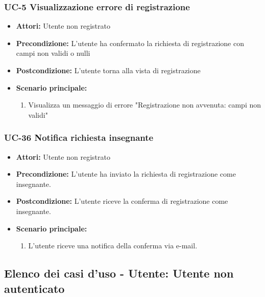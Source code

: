 \subsubsection{UC-5 Visualizzazione errore di registrazione}
\begin{itemize}
	\item \textbf{Attori:} Utente non registrato
	\item \textbf{Precondizione:} L'utente ha confermato la richiesta di registrazione con campi non validi o nulli
	\item \textbf{Postcondizione:} L'utente torna alla vista di registrazione
	\item  \textbf{Scenario principale: }
	\begin{enumerate}
		\item Visualizza un messaggio di errore "Registrazione non avvenuta: campi non validi"
	\end{enumerate}
\end{itemize}

\subsubsection{UC-36 Notifica richiesta insegnante}
   \begin{itemize}
   \item \textbf{Attori:} Utente non registrato
   \item \textbf{Precondizione:} L'utente ha inviato la richiesta di registrazione come insegnante.
   \item \textbf{Postcondizione:} L'utente riceve la conferma di registrazione come insegnante. 
   \item \textbf{Scenario principale:}
    \begin{enumerate}
     \item L'utente riceve una notifica della conferma via e-mail.
    \end{enumerate}
  \end{itemize}

\subsection{Elenco dei casi d'uso - Utente: Utente non autenticato}

